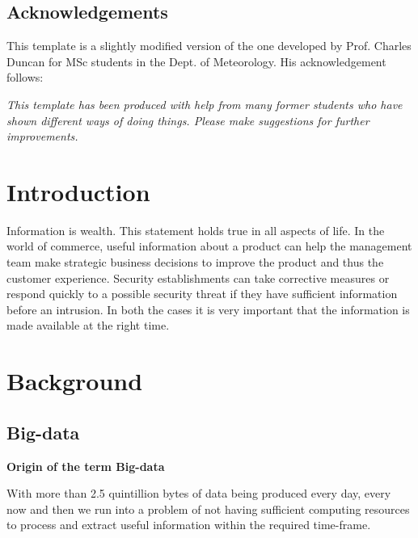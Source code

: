 \documentclass[12pt,a4paper]{report}
\begin{document}

\tableofcontents
\listoftables
\listoffigures

\begin{titlepage}
\vspace*{2in}
\section*{Acknowledgements}

This template is a slightly modified version of the one developed by
Prof. Charles Duncan for MSc students in the Dept. of Meteorology. His
acknowledgement follows:

{\em This template has been produced with help from many former students who
have shown different ways of doing things. Please make suggestions for
further improvements.}

\end{titlepage}


\chapter{Introduction}

Information is wealth. This statement holds true in all aspects of
life. In the world of commerce, useful information about a product 
can help the management team make strategic business decisions
to improve the product and thus the customer experience. Security establishments
can take corrective measures or respond quickly to a possible security threat
if they have sufficient information before an intrusion. In both the cases
it is very important that the information is made available at the right time. 

\chapter{Background}

\section{Big-data}

{\bf Origin of the term Big-data}

With more than 2.5 quintillion bytes of data \cite{website:ibm-bigdata} being produced
every day, every now and then we run into a problem of not having 
sufficient computing resources to process and extract useful information
within the required time-frame.
\end{document}
